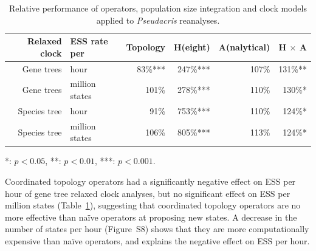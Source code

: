 \documentclass[nogrid]{MBE}%
\begin{document}
\begin{table}[ht!]
\caption{Relative performance of operators, population size integration and clock models applied to \textit{Pseudacris} reanalyses.}
\label{tab:convergenceLM}
\begin{threeparttable}
\begin{tabular*}{\textwidth}{@{\extracolsep{\fill}}rlrrrr@{}}
\hline
Relaxed clock & ESS rate per & Topology & H(eight) & A(nalytical) & H $\times$ A\tabularnewline
\hline
Gene trees & hour & 83\%{***} & 247\%{***} & 107\%\hphantom{***} & 131\%{**}\hphantom{*}\tabularnewline
Gene trees & million states & 101\%\hphantom{***} & 278\%{***} & 110\%\hphantom{***} & 130\%{*}\hphantom{**}\tabularnewline
Species tree & hour & 91\%\hphantom{***} & 753\%{***} & 110\%\hphantom{***} & 124\%{*}\hphantom{**}\tabularnewline
Species tree & million states & 106\%\hphantom{***} & 805\%{***} & 113\%\hphantom{***} & 124\%{*}\hphantom{**}\tabularnewline
\hline
\end{tabular*}
\begin{tablenotes}
\item {*}: $p < 0.05$, {**}: $p < 0.01$, {***}: $p < 0.001$.
\end{tablenotes}
\end{threeparttable}
\end{table}

Coordinated topology operators had a significantly negative effect on ESS per
hour of gene tree relaxed clock analyses, but no significant effect on ESS per
million states (Table~\ref{tab:convergenceLM}), suggesting that coordinated
topology operators are no more effective than na\"ive operators at proposing new
states. A decrease in the number of states per hour (Figure~S8) shows that they
are more computationally expensive than na\"ive operators, and explains the
negative effect on ESS per hour.
\end{document}
